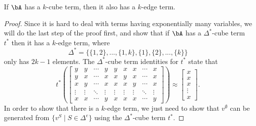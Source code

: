 \begin{thm}\label{cube-edge} If $\bA$ has a $k$-cube term, then it also has a $k$-edge term.
\end{thm}
\begin{proof} Since it is hard to deal with terms having exponentially many variables, we will do the last step of the proof first, and show that if $\bA$ has a $\Delta^*$-cube term $t^*$ then it has a $k$-edge term, where
\[
\Delta^* = \{\{1,2\}, ..., \{1,k\}, \{1\}, \{2\}, ..., \{k\}\}
\]
only has $2k-1$ elements. The $\Delta^*$-cube term identities for $t^*$ state that
\[
t^*\left(\begin{bmatrix} y & y & \cdots & y & y & x & x & \cdots & x\\ y & x & \cdots & x & x & y & x & \cdots & x\\ x & y & \cdots & x & x & x & y & \cdots & x\\ \vdots & \vdots & \ddots & \vdots & \vdots & \vdots & \vdots & \ddots & \vdots \\ x & x & \cdots & y & x & x & x & \cdots & y \end{bmatrix}\right) \approx \begin{bmatrix}x\\ x\\ x\\ \vdots \\ x\end{bmatrix}.
\]
In order to show that there is a $k$-edge term, we just need to show that $v^\emptyset$ can be generated from $\{v^S \mid S \in \Delta^e\}$ using the $\Delta^*$-cube term $t^*$.


\end{proof}
